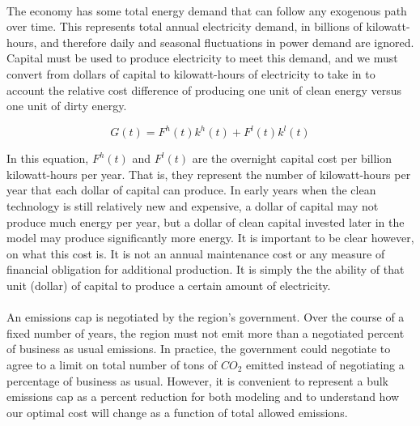 \documentclass[singlespace]{easychithesis}
\begin{document}


\paragraph{} The economy has some total energy demand that can follow any exogenous path over time. This represents total annual electricity demand, in billions of kilowatt-hours, and therefore daily and seasonal fluctuations in power demand are ignored. Capital must be used to produce electricity to meet this demand, and we must convert from dollars of capital to kilowatt-hours of electricity to take in to account the relative cost difference of producing one unit of clean energy versus one unit of dirty energy. 

\begin{equation}
G(t) = F^h(t) k^h(t) + F^l(t) k^l(t)
\end{equation}

In this equation, $F^h (t)$ and $F^l (t)$ are the overnight capital cost per billion kilowatt-hours per year. That is, they represent the number of kilowatt-hours per year that each dollar of capital can produce. In early years when the clean technology is still relatively new and expensive, a dollar of capital may not produce much energy per year, but a dollar of clean capital invested later in the model may produce significantly more energy. It is important to be clear however, on what this cost is. It is not an annual maintenance cost or any measure of financial obligation for additional production. It is simply the the ability of that unit (dollar) of capital to produce a certain amount of electricity. 



\paragraph{} An emissions cap is negotiated by the region's government. Over the course of a fixed number of years, the region must not emit more than a negotiated percent of business as usual emissions. In practice, the government could negotiate to agree to a limit on total number of tons of $CO_2$ emitted instead of negotiating a percentage of business as usual. However, it is convenient to represent a bulk emissions cap as a percent reduction for both modeling and to understand how our optimal cost will change as a function of total allowed emissions.
\end{document}
